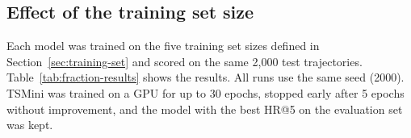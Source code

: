 \subsection{Effect of the training set size}
\label{sec:fraction-results}

Each model was trained on the five training set sizes defined in
Section~\ref{sec:training-set} and scored on the same 2{,}000 test trajectories.
Table~\ref{tab:fraction-results} shows the results. All runs use the same seed
(2000). TSMini was trained on a GPU for up to 30 epochs, stopped early after 5
epochs without improvement, and the model with the best HR@5 on the evaluation set
was kept.

